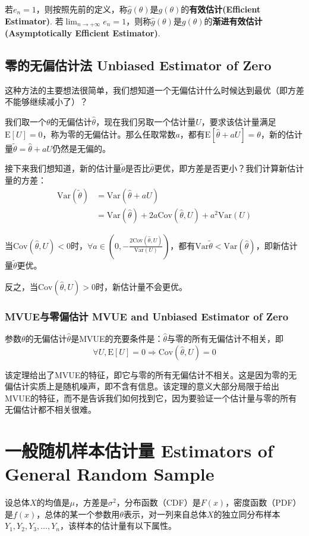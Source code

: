 \documentclass[UTF8]{ctexbook}
\begin{document}
若$e_n=1$，则按照先前的定义，称$\hat g(\theta)$是$g(\theta)$的\textbf{有效估计(Efficient Estimator)}. 若$\lim_{n\to +\infty}e_n=1$，则称$\hat g(\theta)$是$g(\theta)$的\textbf{渐进有效估计(Asymptotically Efficient Estimator)}.
\subsection{零的无偏估计法 Unbiased Estimator of Zero}
这种方法的主要想法很简单，我们想知道一个无偏估计什么时候达到最优（即方差不能够继续减小了）？

我们取一个$\theta$的无偏估计$\hat\theta$，现在我们另取一个估计量$U$，要求该估计量满足$\mathrm E[U]=0$，称为零的无偏估计。那么任取常数$a$，都有$\mathrm E[\hat\theta+aU]=\theta$，新的估计量$\tilde\theta=\hat\theta+aU$仍然是无偏的。

接下来我们想知道，新的估计量$\tilde\theta$是否比$\hat\theta$更优，即方差是否更小？我们计算新估计量的方差：
\begin{align*}
	\mathrm{Var}(\tilde\theta)&=\mathrm{Var}(\hat\theta+aU)\\
	&=\mathrm{Var}(\hat\theta)+2a\mathrm{Cov}(\hat\theta,U)+a^2\mathrm{Var}(U)
\end{align*}

当$\mathrm{Cov}(\hat\theta,U)<0$时，$\forall a\in\left(0,-\frac{2\mathrm{Cov}(\hat\theta,U)}{\mathrm{Var}(U)}\right)$，都有$\mathrm{Var}{\tilde\theta}<\mathrm{Var}(\hat\theta)$，即新估计量$\tilde\theta$更优。

反之，当$\mathrm{Cov}(\hat\theta,U)>0$时，新估计量不会更优。
\subsubsection{MVUE与零偏估计 MVUE and Unbiased Estimator of Zero}
参数$\theta$的无偏估计$\hat\theta$是MVUE的充要条件是：$\hat\theta$与零的所有无偏估计不相关，即
\[
	\forall U, \mathrm E[U]=0\Longrightarrow\mathrm{Cov}(\hat\theta,U)=0
\]

该定理给出了MVUE的特征，即它与零的所有无偏估计不相关。这是因为零的无偏估计实质上是随机噪声，即不含有信息。该定理的意义大部分局限于给出MVUE的特征，而不是告诉我们如何找到它，因为要验证一个估计量与零的所有无偏估计都不相关很难。

\section{一般随机样本估计量 Estimators of General Random Sample}
设总体$X$的均值是$\mu$，方差是$\sigma^2$，分布函数（CDF）是$F(x)$，密度函数（PDF）是$f(x)$，总体的某一个参数用$\theta$表示，对一列来自总体$X$的独立同分布样本$Y_1,Y_2,Y_3,\dots,Y_n$，该样本的估计量有以下属性。
\end{document}
